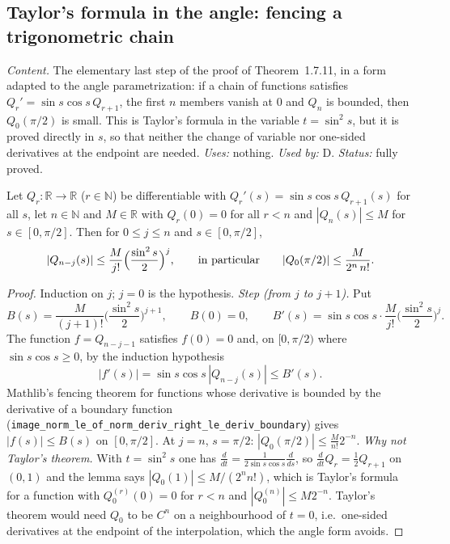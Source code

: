 \subsection{Taylor's formula in the angle: fencing a trigonometric chain}
\label{sec:sg-tal:fluct-taylor}

\emph{Content.}  The elementary last step of the proof of Theorem~1.7.11, in a form adapted to the angle parametrization: if a chain
of functions satisfies $Q_r'=\sin s\cos s\,Q_{r+1}$, the first $n$ members vanish at $0$ and $Q_n$ is bounded, then $Q_0(\pi/2)$ is small.
This is Taylor's formula in the variable $t=\sin^2 s$, but it is proved directly in $s$, so that neither the change of variable nor one-sided
derivatives at the endpoint are needed.
\emph{Uses:} nothing.  \emph{Used by:} D.  \emph{Status:} fully proved.

\begin{lemma}
\label{lem:sg-tal:taylor-vanishing}
  \leanok
{}
Let $Q_r:\mathbb R\to\mathbb R$ ($r\in\mathbb N$) be differentiable with $Q_r'(s)=\sin s\cos s\,Q_{r+1}(s)$ for all $s$, let $n\in\mathbb N$ and $M\in\mathbb R$ with $Q_r(0)=0$ for all $r<n$ and
$|Q_n(s)|\le M$ for $s\in[0,\pi/2]$.  Then for $0\le j\le n$ and $s\in[0,\pi/2]$,
\[
|Q_{n-j}(s)|\le\frac{M}{j!}\Bigl(\frac{\sin^2s}{2}\Bigr)^{j},\qquad\text{in particular}\qquad |Q_0(\pi/2)|\le\frac{M}{2^n\,n!}.
\]
\end{lemma}
\begin{proof}
  \leanok
Induction on $j$; $j=0$ is the hypothesis.
\emph{Step (from $j$ to $j+1$).} Put
\[
B(s)=\frac M{(j+1)!}\Big(\frac{\sin^2s}2\Big)^{j+1},\qquad B(0)=0,\qquad B'(s)=\sin s\cos s\cdot\frac M{j!}\Big(\frac{\sin^2s}2\Big)^j .
\]
The function $f=Q_{n-j-1}$ satisfies $f(0)=0$ and, on $[0,\pi/2)$ where $\sin s\cos s\ge0$, by the induction hypothesis
\[
|f'(s)|=\sin s\cos s\,|Q_{n-j}(s)|\le B'(s).
\]
Mathlib's fencing theorem for functions whose derivative is bounded by the derivative of a boundary function (\texttt{image\_norm\_le\_of\_norm\_deriv\_right\_le\_deriv\_boundary}) gives $|f(s)|\le B(s)$ on $[0,\pi/2]$. At $j=n$, $s=\pi/2$: $|Q_0(\pi/2)|\le\frac M{n!}2^{-n}$.
\emph{Why not Taylor's theorem.}  With $t=\sin^2s$ one has $\frac d{dt}=\frac1{2\sin s\cos s}\frac d{ds}$, so $\frac{d}{dt}Q_r=\frac12Q_{r+1}$ on $(0,1)$ and the lemma says $|Q_0(1)|\le M/(2^nn!)$, which
is Taylor's formula for a function with $Q_0^{(r)}(0)=0$ for $r<n$ and $|Q_0^{(n)}|\le M2^{-n}$.  Taylor's theorem would need $Q_0$ to be $C^n$ on a neighbourhood of $t=0$, i.e.\ one-sided derivatives at the endpoint of the interpolation, which the angle form avoids.
\end{proof}

